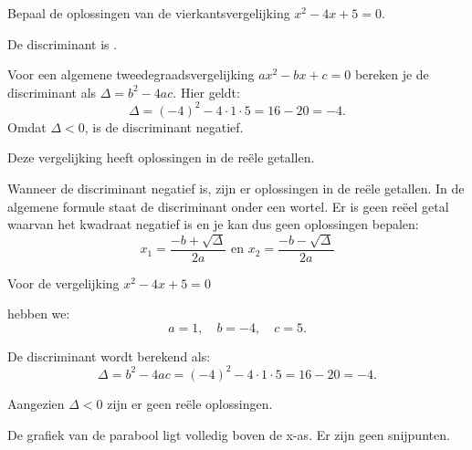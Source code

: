 \documentclass{ximera}
\begin{document}
\begin{exercise}

    Bepaal de oplossingen van de vierkantsvergelijking \( x^2 - 4x + 5 = 0 \). 
    
    
    \begin{question}
    De discriminant is \choicenegatief.
    \begin{feedback}
        Voor een algemene tweedegraadsvergelijking \(ax^2 - bx + c = 0\) bereken je de discriminant als \(\Delta = b^2 - 4ac\). 
        Hier geldt: 
        \[
        \Delta = (-4)^2 - 4\cdot1\cdot5 = 16 - 20 = -4.
        \]
        Omdat \(\Delta < 0\), is de discriminant negatief.
    \end{feedback}
    \end{question}
    
    \begin{question}
    Deze vergelijking heeft \choicegeen oplossingen in de reële getallen.
    \begin{feedback}
        Wanneer de discriminant negatief is, zijn er oplossingen in de reële getallen. 
        In de algemene formule staat de discriminant onder een wortel. 
        Er is geen reëel getal waarvan het kwadraat negatief is en je kan dus geen oplossingen bepalen: 
        \[
        x_{1} = \frac{-b + \sqrt{\Delta}}{2a}  \text{ en }  x_{2} = \frac{-b - \sqrt{\Delta}}{2a}
        \]

    \end{feedback}
    \end{question}
    
    \begin{oplossing}
    Voor de vergelijking \( x^2 - 4x + 5 = 0 \)
    
    hebben we:
    \[
    a = 1,\quad b = -4,\quad c = 5.
    \]
    
    De discriminant wordt berekend als:
    \[
    \Delta = b^2 - 4ac = (-4)^2 - 4\cdot1\cdot5 = 16 - 20 = -4.
    \]
    
    Aangezien \(\Delta < 0\) zijn er geen reële oplossingen. 

    De grafiek van de parabool ligt volledig boven de x-as. Er zijn geen snijpunten. 
    \begin{image}
    \end{image}

    
    \end{oplossing}
    
\end{exercise}
    
\end{document}
